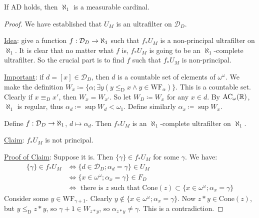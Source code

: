 \documentclass[]{article}
\newcommand{\om}{\omega}
\renewcommand{\ac}{\textrm{AC}}
\newcommand{\wf}{\textrm{WF}}
\newcommand{\ad}{\textrm{AD}}
\newcommand{\led}{\le_{\mathrm{D}}}
\newcommand{\D}{\mathcal{D}}
\newcommand{\cone}{\textrm{Cone}}
\begin{document}
\begin{theorem*}[Solovay]
    If $\ad$ holds, then $\aleph_1$ is a measurable cardinal.
\end{theorem*}
\begin{proof}
    We have established that $U_M$ is an ultrafilter on $\D_D$.
    
    \underline{Idea}: give a function $f:\D_D \ra \aleph_1$ such that $f_\ast U_M$ is a non-principal ultrafilter on $\aleph_1$. It is clear that no matter what $f$ is, $f_\ast U_M$ is going to be an $\aleph_1$-complete ultrafilter. So the crucial part is to find $f$ such that $f_\ast U_M$ is non-principal.

    \underline{Important}: if $d = [x] \in \D_D$, then $d$ is a countable set of elements of $\om^\om$. We make the definition $W_x \coloneqq \{\alpha; \exists y(y\led x \land y \in \wf_\alpha)\}$. This is a countable set. Clearly if $x\equiv_D x'$, then $W_x = W_{x'}$. So let $W_D \coloneqq W_x$ for any $x \in d$. By $\ac_\om(\R)$, $\aleph_1$ is regular, thus $\alpha_d \coloneqq \sup W_d < \om_1$. Define similarly $\alpha_x \coloneqq \sup W_x$.

    Define $f : \D_D \ra \aleph_1$, $d\mapsto \alpha_d$. Then $f_\ast U_M$ is an $\aleph_1$-complete ultrafilter on $\aleph_1$.

    \underline{Claim}: $f_\ast U_M$ is not principal.

    \underline{Proof of Claim}: Suppose it is. Then $\{\gamma\} \in f_\ast U_M$ for some $\gamma$. We have:
    \begin{align*}
        \{\gamma\} \in f_\ast U_M &\iff \{d \in \D_D;\alpha_d = \gamma\} \in U_M\\
        &\iff \{x \in \om^\om;\alpha_x = \gamma\}\in F_D\\
        &\iff \textrm{ there is }z\textrm{ such that }\cone(z)\subset \{x\in\om^\om;\alpha_x = \gamma\}
    \end{align*}
    Consider some $y \in \wf_{\gamma+1}$. Clearly $y \not\in \{x \in \om^\om;\alpha_x = \gamma\}$. Now $z\ast y \in \cone(z)$, but $y \led z\ast y$, so $\gamma+1 \in W_{z\ast y}$, so $\alpha_{z\ast y} \ne \gamma$. This is a contradiction.
\end{proof}
\end{document}
